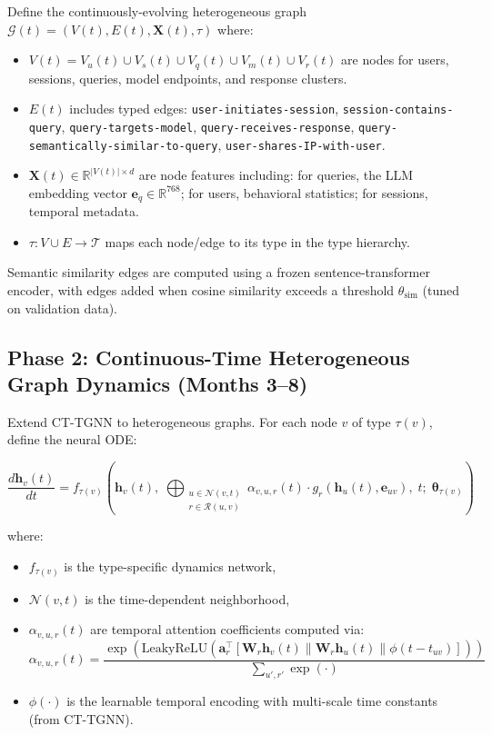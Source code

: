 \documentclass[12pt,a4paper]{article}
\newcommand{\R}{\mathbb{R}}
\newcommand{\calG}{\mathcal{G}}
\begin{document}
Define the continuously-evolving heterogeneous graph $\calG(t) = (V(t), E(t), \mathbf{X}(t), \tau)$ where:

\begin{itemize}
    \item $V(t) = V_u(t) \cup V_s(t) \cup V_q(t) \cup V_m(t) \cup V_r(t)$ are nodes for users, sessions, queries, model endpoints, and response clusters.
    \item $E(t)$ includes typed edges: \texttt{user-initiates-session}, \texttt{session-contains-query}, \texttt{query-targets-model}, \texttt{query-receives-response}, \texttt{query-semantically-similar-to-query}, \texttt{user-shares-IP-with-user}.
    \item $\mathbf{X}(t) \in \R^{|V(t)| \times d}$ are node features including: for queries, the LLM embedding vector $\mathbf{e}_q \in \R^{768}$; for users, behavioral statistics; for sessions, temporal metadata.
    \item $\tau: V \cup E \to \mathcal{T}$ maps each node/edge to its type in the type hierarchy.
\end{itemize}

Semantic similarity edges are computed using a frozen sentence-transformer encoder, with edges added when cosine similarity exceeds a threshold $\theta_{\text{sim}}$ (tuned on validation data).

\subsection{Phase 2: Continuous-Time Heterogeneous Graph Dynamics (Months 3--8)}

Extend CT-TGNN to heterogeneous graphs. For each node $v$ of type $\tau(v)$, define the neural ODE:

\begin{equation}
    \frac{d\mathbf{h}_v(t)}{dt} = f_{\tau(v)}\left(\mathbf{h}_v(t),\; \bigoplus_{\substack{u \in \mathcal{N}(v,t) \\ r \in \mathcal{R}(u,v)}} \alpha_{v,u,r}(t) \cdot g_r(\mathbf{h}_u(t), \mathbf{e}_{uv}),\; t;\; \boldsymbol{\theta}_{\tau(v)}\right)
\end{equation}

where:
\begin{itemize}
    \item $f_{\tau(v)}$ is the type-specific dynamics network,
    \item $\mathcal{N}(v,t)$ is the time-dependent neighborhood,
    \item $\alpha_{v,u,r}(t)$ are temporal attention coefficients computed via:
    \begin{equation}
        \alpha_{v,u,r}(t) = \frac{\exp\left(\text{LeakyReLU}\left(\mathbf{a}_r^\top [\mathbf{W}_r \mathbf{h}_v(t) \| \mathbf{W}_r \mathbf{h}_u(t) \| \phi(t - t_{uv})]\right)\right)}{\sum_{u',r'} \exp(\cdot)}
    \end{equation}
    \item $\phi(\cdot)$ is the learnable temporal encoding with multi-scale time constants (from CT-TGNN).
\end{itemize}
\end{document}
